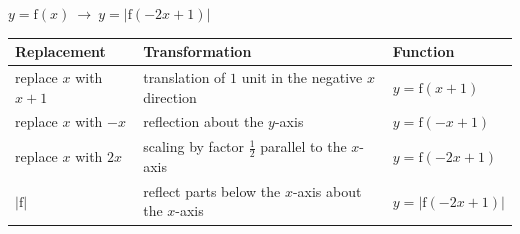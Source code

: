 \documentclass[a4paper,11pt,oneside]{book}
\begin{document}
\exlab $y=\mathrm{f}(x)\ \longrightarrow\ y=|\mathrm{f}(-2x+1)|$\par\smallskip
{\renewcommand{\arraystretch}{1.3}\centering\begin{tabular}{|l|l|l|}\hline
\textbf{Replacement} & \textbf{Transformation} & \textbf{Function}\\\hline
replace $x$ with $x+1$ & translation of $1$ unit in the negative $x$ direction & $y=\mathrm{f}(x+1)$\\\hline
replace $x$ with $-x$ & reflection about the $y$-axis & $y=\mathrm{f}(-x+1)$\\\hline
replace $x$ with $2x$ & scaling by factor $\frac12$ parallel to the $x$-axis & $y=\mathrm{f}(-2x+1)$\\\hline
$|\mathrm{f}|$ & reflect parts below the $x$-axis about the $x$-axis & $y=|\mathrm{f}(-2x+1)|$\\\hline
\end{tabular}\par}
\clearpage
\end{document}
